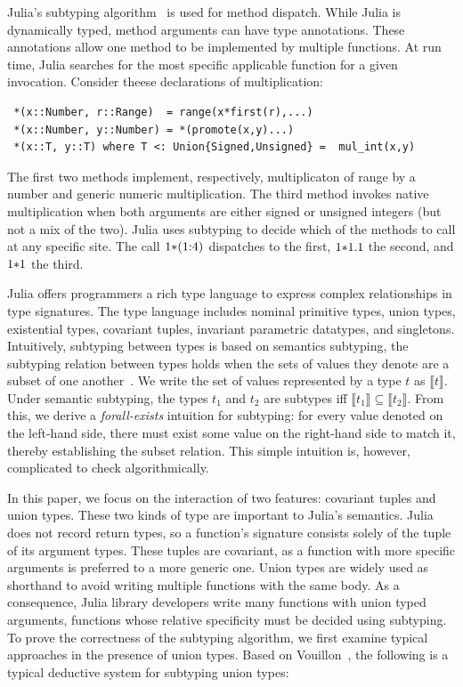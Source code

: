 \documentclass[a4paper,english]{lipics-v2019}
\newcommand{\denotes}[1]{\llbracket #1 \rrbracket}
\renewcommand{\c}[1]{\ensuremath{\text{\lstinline{#1}}}\xspace}
\begin{document}
Julia's subtyping algorithm~\cite{bezansonthesis} is
used for method dispatch. While Julia is  dynamically typed,
method arguments can have type annotations. These 
annotations allow one method to be implemented by multiple functions.
At run time, Julia searches for the most specific 
applicable function  for a given invocation.  Consider theese declarations of multiplication:

\begin{lstlisting}
 *(x::Number, r::Range)  = range(x*first(r),...)
 *(x::Number, y::Number) = *(promote(x,y)...)
 *(x::T, y::T) where T <: Union{Signed,Unsigned} =  mul_int(x,y)
\end{lstlisting}

\noindent The first two methods implement, respectively, multiplicaton of 
range by a number and generic numeric multiplication. The
third method invokes native multiplication when both arguments are either
signed or unsigned integers (but not a mix of the two). Julia uses subtyping
to decide which of the methods to call at any specific site. The call
\c{1*(1:4)} dispatches to the first, \c{1*1.1} the second, and \c{1*1} the third.

Julia offers programmers a rich type language to express complex
relationships in type signatures. The type language includes nominal
primitive types, union types, existential types, covariant tuples, invariant
parametric datatypes, and singletons. Intuitively, subtyping between types
is based on semantics subtyping, the subtyping relation between types holds
when the sets of values they denote are a subset of one
another~\cite{BezansonEKS17}. We write the set of values represented by a
type $t$ as {\small $\denotes{t}$}. Under semantic subtyping, the types
$t_1$ and $t_2$ are subtypes iff {\small $\denotes{t_1} \subseteq
  \denotes{t_2}$}. From this, we derive a \emph{forall-exists} intuition for
subtyping: for every value denoted on the left-hand side, there must exist
some value on the right-hand side to match it, thereby establishing the
subset relation. This simple intuition is, however, complicated to check
algorithmically.

In this paper, we focus on the interaction of two features: covariant
tuples and union types. These two kinds of type are important to Julia's
semantics. Julia does not record
return types, so a function's signature consists solely of the
tuple of its argument types. These tuples are covariant, as a function with
more specific arguments  is preferred to a
more generic one. Union types are widely used as shorthand to avoid writing
multiple functions with the same body. As a consequence, Julia library
developers write many functions with union typed arguments, functions whose
relative specificity must be decided using subtyping. To prove
the correctness of
the subtyping algorithm, we first examine typical approaches
in the presence of union types. Based on Vouillon~\cite{Vouillon04},
the following is a typical deductive system for subtyping union types:
\end{document}
